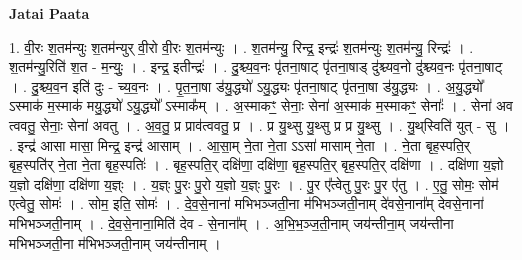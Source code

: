 \documentclass[17pt]{extarticle}
\begin{document}
\textbf{Jatai Paata} \newline

1. वी॒रः श॒तम॑न्युः श॒तम॑न्युर् वी॒रो वी॒रः श॒तम॑न्युः । . श॒तम॑न्यु॒ रिन्द्र॒ इन्द्रः॑ श॒तम॑न्युः श॒तम॑न्यु॒ रिन्द्रः॑ । . श॒तम॑न्यु॒रिति॑ श॒त - म॒न्युः॒ । . इन्द्र॒ इतीन्द्रः॑ । . दु॒श्च्य॒व॒नः पृ॑तना॒षाट् पृ॑तना॒षाड् दु॑श्च्यव॒नो दु॑श्च्यव॒नः पृ॑तना॒षाट् । . दु॒श्च्य॒व॒न इति॑ दुः - च्य॒व॒नः । . पृ॒त॒ना॒षा ड॑यु॒द्ध्यो॑ ऽयु॒द्ध्यः पृ॑तना॒षाट् पृ॑तना॒षा ड॑यु॒द्ध्यः । . अ॒यु॒द्ध्यो᳚ ऽस्माक॑ म॒स्माक॑ मयु॒द्ध्यो॑ ऽयु॒द्ध्यो᳚ ऽस्माक᳚म् । . अ॒स्माकꣳ॒॒ सेनाः॒ सेना॑ अ॒स्माक॑ म॒स्माकꣳ॒॒ सेनाः᳚ । . सेना॑ अव त्ववतु॒ सेनाः॒ सेना॑ अवतु । . अ॒व॒तु॒ प्र प्राव॑त्ववतु॒ प्र । . प्र यु॒थ्सु यु॒थ्सु प्र प्र यु॒थ्सु । . यु॒थ्‌स्विति॑ युत् - सु । . इन्द्र॑ आसा मासा॒ मिन्द्र॒ इन्द्र॑ आसाम् । . आ॒सा॒म् ने॒ता ने॒ता ऽऽसा॑ मासाम् ने॒ता । . ने॒ता बृह॒स्पति॒र् बृह॒स्पति॑र् ने॒ता ने॒ता बृह॒स्पतिः॑ । . बृह॒स्पति॒र् दक्षि॑णा॒ दक्षि॑णा॒ बृह॒स्पति॒र् बृह॒स्पति॒र् दक्षि॑णा । . दक्षि॑णा य॒ज्ञो य॒ज्ञो दक्षि॑णा॒ दक्षि॑णा य॒ज्ञ्ः । . य॒ज्ञ्ः पु॒रः पु॒रो य॒ज्ञो य॒ज्ञ्ः पु॒रः । . पु॒र ए᳚त्वेतु पु॒रः पु॒र ए॑तु । . ए॒तु॒ सोमः॒ सोम॑ एत्वेतु॒ सोमः॑ । . सोम॒ इति॒ सोमः॑ । . दे॒व॒से॒नाना॑ मभिभञ्जती॒ना म॑भिभञ्जती॒नाम् दे॑वसे॒नाना᳚म् देवसे॒नाना॑ मभिभञ्जती॒नाम् । . दे॒व॒से॒नाना॒मिति॑ देव - से॒नाना᳚म् । . अ॒भि॒भ॒ञ्ज॒ती॒नाम् जय॑न्तीना॒म् जय॑न्तीना मभिभञ्जती॒ना म॑भिभञ्जती॒नाम् जय॑न्तीनाम् । \newline
\end{document}
